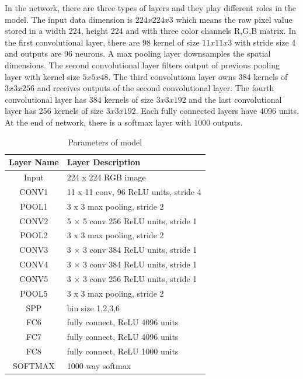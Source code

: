 In the network, there are three types of layers and they play different roles in the model. The input data dimension is $224x224x3$ which means the raw pixel value stored in a width 224, height 224 and with three color channels R,G,B matrix. In the first convolutional layer, there are 98 kernel of size $11x11x3$ with stride size 4 and outputs are 96 neurons. A max pooling layer downsamples the spatial dimensions. The second convolutional layer filters output of previous pooling layer with kernel size $5x5x48$. The third convolutiona layer owns 384 kernels of $3x3x256$ and receives outputs of the second convolutional layer. The fourth convolutional layer has 384 kernels of size $3x3x192$ and the last convolutional layer has 256 kernels of size $3x3x192$. Each fully connected layers have 4096 units. At the end of network, there is a softmax layer with 1000 outputs.
\begin{table}[h]
\begin{center}
    \begin{tabular}{ | c | p{8cm} | }
    \hline
    Layer Name & Layer Description \\ \hline
    Input & 224 x 224 RGB image \\ \hline
    CONV1 & 11 x 11 conv, 96 ReLU units, stride 4 \\ \hline
    POOL1 & 3 x 3 max pooling, stride 2 \\ \hline
    CONV2 & 5 × 5 conv 256 ReLU units, stride 1 \\ \hline
    POOL2 & 3 x 3 max pooling, stride 2 \\ \hline
    CONV3 & 3 × 3 conv 384 ReLU units, stride 1 \\ \hline
    CONV4 & 3 × 3 conv 384 ReLU units, stride 1 \\ \hline
    CONV5 & 3 × 3 conv 256 ReLU units, stride 1 \\ \hline
    POOL5 & 3 x 3 max pooling, stride 2 \\ \hline
    SPP & bin size 1,2,3,6 \\ \hline
    FC6 & fully connect, ReLU 4096 units\\ \hline
    FC7 & fully connect, ReLU 4096 units\\ \hline
    FC8 & fully connect, ReLU 1000 units\\ \hline
    SOFTMAX & 1000 way softmax\\ \hline
    \end{tabular}
    \caption{Parameters of model}
    \label{fig:NetPara}
\end{center}
\end{table}

















